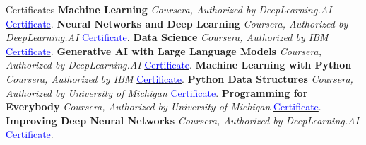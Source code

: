 \begin{rubric}{Certificates}
\entry* \textbf{Machine Learning}  
\emph{Coursera, Authorized by DeepLearning.AI}  
\href{https://coursera.org/share/bbc515ff95ad8277951d1b05fafd3c4e}{\textcolor{blue}{Certificate}}.
\entry* \textbf{Neural Networks and Deep Learning}  
\emph{Coursera, Authorized by DeepLearning.AI}  
\href{https://coursera.org/verify/N5CQEJ7NTFGD}{\textcolor{blue}{Certificate}}.
\entry* \textbf{Data Science}  
\emph{Coursera, Authorized by IBM}  
\href{https://coursera.org/verify/ZRWAXS8C6DYW}{\textcolor{blue}{Certificate}}.
\entry* \textbf{Generative AI with Large Language Models}  
\emph{Coursera, Authorized by DeepLearning.AI}  
\href{https://coursera.org/verify/38NY9GKSBAU8}{\textcolor{blue}{Certificate}}.
\entry* \textbf{Machine Learning with Python}  
\emph{Coursera, Authorized by IBM}  
\href{https://coursera.org/verify/NXKVEXU4TSR5}{\textcolor{blue}{Certificate}}.
\entry* \textbf{Python Data Structures}  
\emph{Coursera, Authorized by University of Michigan}  
\href{https://www.coursera.org/account/accomplishments/verify/2TL5G3JBMUMF}{\textcolor{blue}{Certificate}}.
\entry* \textbf{Programming for Everybody}  
\emph{Coursera, Authorized by University of Michigan}  
\href{https://www.coursera.org/account/accomplishments/verify/2N35KET5ZE73}{\textcolor{blue}{Certificate}}.
\entry* \textbf{Improving Deep Neural Networks}  
\emph{Coursera, Authorized by DeepLearning.AI}  
\href{https://coursera.org/verify/ERHN7AAM4BDG}{\textcolor{blue}{Certificate}}.
\end{rubric}